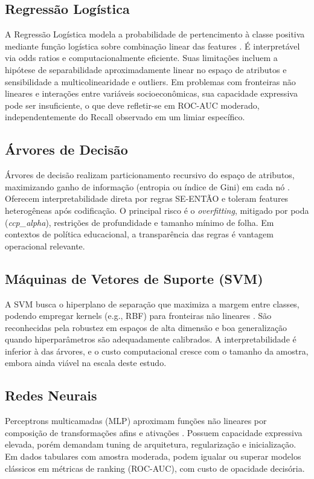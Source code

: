 \documentclass[conference]{IEEEtran}
\begin{document}
\subsection{Regressão Logística}
A Regressão Logística modela a probabilidade de pertencimento à classe positiva mediante função logística sobre combinação linear das features \cite{hosmer2013}. É interpretável via odds ratios e computacionalmente eficiente. Suas limitações incluem a hipótese de separabilidade aproximadamente linear no espaço de atributos e sensibilidade a multicolinearidade e outliers. Em problemas com fronteiras não lineares e interações entre variáveis socioeconômicas, sua capacidade expressiva pode ser insuficiente, o que deve refletir-se em ROC-AUC moderado, independentemente do Recall observado em um limiar específico.

\subsection{Árvores de Decisão}
Árvores de decisão realizam particionamento recursivo do espaço de atributos, maximizando ganho de informação (entropia ou índice de Gini) em cada nó \cite{breiman1984}. Oferecem interpretabilidade direta por regras SE-ENTÃO e toleram features heterogêneas após codificação. O principal risco é o \textit{overfitting}, mitigado por poda (\textit{ccp\_alpha}), restrições de profundidade e tamanho mínimo de folha. Em contextos de política educacional, a transparência das regras é vantagem operacional relevante.

\subsection{Máquinas de Vetores de Suporte (SVM)}
A SVM busca o hiperplano de separação que maximiza a margem entre classes, podendo empregar kernels (e.g., RBF) para fronteiras não lineares \cite{cortes1995}. São reconhecidas pela robustez em espaços de alta dimensão e boa generalização quando hiperparâmetros são adequadamente calibrados. A interpretabilidade é inferior à das árvores, e o custo computacional cresce com o tamanho da amostra, embora ainda viável na escala deste estudo.

\subsection{Redes Neurais}
Perceptrons multicamadas (MLP) aproximam funções não lineares por composição de transformações afins e ativações \cite{haykin2009}. Possuem capacidade expressiva elevada, porém demandam tuning de arquitetura, regularização e inicialização. Em dados tabulares com amostra moderada, podem igualar ou superar modelos clássicos em métricas de ranking (ROC-AUC), com custo de opacidade decisória.
\end{document}
